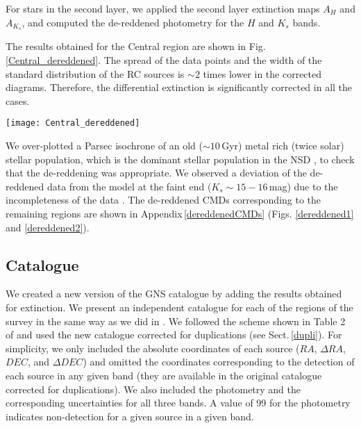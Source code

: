 \documentclass{aa}
\begin{document}
For stars in the second layer, we applied the second layer extinction maps $A_H$ and $A_{K_s}$, and computed the de-reddened photometry for the $H$ and $K_s$ bands. 





The results obtained for the Central region are shown in Fig.\,\ref{Central_dereddened}. The spread of the data points and the width of the standard distribution of the RC sources is  $\sim2$ times lower in the corrected diagrams. Therefore, the differential extinction is significantly corrected in all the cases. 

       \begin{figure*}
   \texttt{[image: Central\_dereddened]}
   \caption{Colour-magnitude diagrams before and after the application of the extinction maps to the Central region of the GNS survey. The red and black dots correspond to the original and the de-reddened CMDs, respectively. Only a fraction of stars are plotted given the high number of sources. The labels above each panel indicate the corresponding extinction layer. The green line depicts a Parsec isochrone of $\sim 10$ Gyr with twice solar metallicity. The blue and green error bars indicate the systematic uncertainties of the de-reddening and the ZP, respectively.}

   \label{Central_dereddened}
    \end{figure*}
    

We over-plotted a Parsec isochrone \citep[release v1.2S + COLIBRI S\_35 + PR16, ][]{Bressan:2012aa,Chen:2014aa,Chen:2015aa,Tang:2014rm,Marigo:2017aa,Pastorelli:2019aa} of an old ($\sim 10$\,Gyr) metal rich (twice solar) stellar population, which is the dominant stellar population in the NSD \citep{Nogueras-Lara:2019ad}, to check that the de-reddening was appropriate. We observed a deviation of the de-reddened data from the model at the faint end ($K_s\sim15-16$\,mag) due to the incompleteness of the data \citep{Nogueras-Lara:2020aa}. The de-reddened CMDs corresponding to the remaining regions are shown in  Appendix\,\ref{dereddenedCMDs} (Figs. \ref{dereddened1} and \ref{dereddened2}).
 
 
\subsection{Catalogue}
 
We created a new version of the GNS catalogue by adding the results obtained  for extinction. We present an independent catalogue for each of the regions of the survey in the same way as we did in \citet{Nogueras-Lara:2019aa}. We followed the scheme shown in Table 2 of \citet{Nogueras-Lara:2019aa} and used the new catalogue corrected for duplications (see Sect.\,\ref{dupli}). For simplicity, we only included the absolute coordinates of each source ($RA$, $\Delta RA$, $DEC$, and $\Delta DEC$) and omitted the coordinates corresponding to the detection of each source in any given band (they are available in the original catalogue corrected for duplications). We also included the photometry and the corresponding uncertainties for all three bands. A value of 99 for the photometry indicates non-detection for a given source in a given band.
\end{document}
